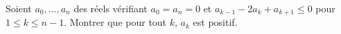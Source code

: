 Soient $a_0, \ldots, a_n$ des réels vérifiant $a_0 = a_n = 0$ et $a_{k-1} - 2a_k + a_{k+1} \leq 0$ pour $1 \leq k \leq n - 1$. Montrer que pour tout $k$, $a_k$ est positif.
